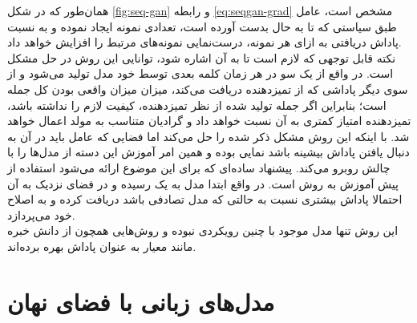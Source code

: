 همان‌طور که در شکل \ref{fig:seq-gan} و رابطه \ref{eq:seqgan-grad} مشخص است، عامل طبق سیاستی که تا به حال بدست آورده است، تعدادی نمونه ایجاد نموده و به نسبت پاداش دریافتی به ازای هر نمونه، درست‌نمایی نمونه‌های مرتبط را افزایش خواهد داد.\\
نکته قابل توجهی که لازم است تا به آن اشاره شود، توانایی این روش در حل مشکل \expbias{} است. در واقع از یک سو در هر زمان کلمه بعدی توسط خود مدل تولید می‌شود و از سوی دیگر پاداشی که از تمیزدهنده دریافت می‌کند، میزان میزان واقعی بودن کل جمله است؛ بنابراین اگر جمله تولید شده از نظر تمیزدهنده، کیفیت لازم را نداشته باشد، تمیزدهنده امتیاز کمتری به آن نسبت خواهد داد و گرادیان متناسب به مولد اعمال خواهد شد. با اینکه این روش مشکل ذکر شده را حل می‌کند اما فضایی که عامل باید در آن به دنبال یافتن پاداش بیشینه باشد نمایی بوده و همین امر آموزش این دسته از مدل‌ها را با چالش روبرو می‌کند. پیشنهاد ساده‌ای که برای این موضوع ارائه می‌شود استفاده از پیش آموزش به روش \teacherforcing{} است. در واقع ابتدا مدل به یک  رسیده و در فضای نزدیک به آن احتمالا پاداش بیشتری نسبت به حالتی که مدل تصادفی باشد دریافت کرده و به اصلاح خود می‌پردازد.\\
این روش تنها مدل موجود با چنین رویکردی نبوده و روش‌هایی همچون \cite{pg_bleu} از دانش خبره مانند معیار  به عنوان پاداش بهره برده‌اند.
\section{مدل‌های زبانی با فضای نهان}
